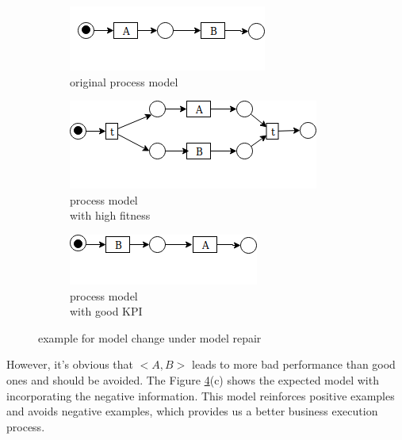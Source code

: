 \documentclass[12pt, a4paper]{article}
\begin{document}
\begin{figure}[h]
	\centering
	\begin{subfigure}[b]{0.32\textwidth}
		\centering
		\includegraphics[width=\linewidth]{P04_modelchange_a.png}
		\caption{original process model}
		\label{fig:model_a}
	\end{subfigure}
\hfill
	\begin{subfigure}[b]{0.32\textwidth}
		\centering
	\includegraphics[width=\linewidth]{P04_modelchange_b.png}
	\caption{process model \\ with high fitness}
	\label{fig:model_b}
\end{subfigure}
\hfill
	\begin{subfigure}[b]{0.32\textwidth}
		\centering
	\includegraphics[width=01.0\linewidth]{P04_modelchange_c.png}
	\caption{process model \\ with good KPI}
	\label{fig:model_c}
\end{subfigure}

	\caption{example for model change under model repair}
	\label{fig:model_examples}
\end{figure}

However, it's obvious that $<A,B>$ leads to more bad performance than good ones and should be avoided. The Figure \ref{fig:model_examples}(c) shows the expected model with incorporating the negative information. This model reinforces positive examples and avoids negative examples, which provides us a better business execution process.
\end{document}

